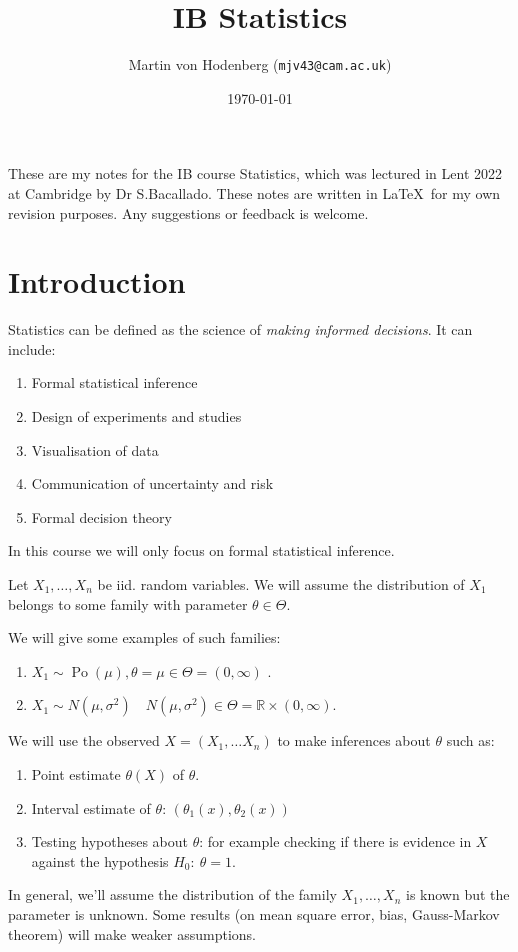 \documentclass[a4paper]{scrartcl}
\title{IB Statistics}
\author{Martin von Hodenberg (\texttt{mjv43@cam.ac.uk})}
\date{\today}
\begin{document}
\maketitle

These are my notes for the IB course Statistics, which was lectured in Lent 2022 at Cambridge by Dr S.Bacallado. These notes are written in \LaTeX  \ for my own revision purposes. Any suggestions or feedback is welcome.



\tableofcontents
\newpage

\section{Introduction}
Statistics can be defined as the science of \emph{making informed decisions}. It can include:
\begin{enumerate}
    \item Formal statistical inference
    \item Design of experiments and studies
    \item Visualisation of data
    \item Communication of uncertainty and risk
    \item Formal decision theory
\end{enumerate}
In this course we will only focus on formal statistical inference.
\begin{definition*}
     Let $X_1 , \ldots , X_n$ be iid. random variables. We will assume the distribution of $X_1 $ belongs to some family with parameter $\theta \in \Theta$.
\end{definition*}
\begin{example*}
    We will give some examples of such families:
     \begin{enumerate}
         \item $X_1 \sim \operatorname{Po}(\mu), \theta=\mu \in \Theta=(0,\infty )$ .
         \item $X_1 \sim N (\mu, \sigma^2) \quad N (\mu, \sigma^2)\in \Theta=\mathbb{R} \times (0, \infty)$.
     \end{enumerate}
\end{example*}
We will use the observed $X= (X_1 , \ldots X_n)$ to make inferences about $\theta$ such as:
\begin{enumerate}
    \item Point estimate $\theta (X)$ of $\theta$.
    \item Interval estimate of $\theta$: $(\theta_1 (x),\theta_2 (x))$ 
    \item Testing hypotheses about $\theta$: for example checking if there is evidence in $X$ against the hypothesis $H_0 : \ \theta=1$.
\end{enumerate}
\begin{remark}
     In general, we'll assume the distribution of the family $X_1 , \ldots , X_n$ is known but the parameter is unknown. Some results (on mean square error, bias, Gauss-Markov theorem) will make weaker assumptions.
\end{remark}
\end{document}
